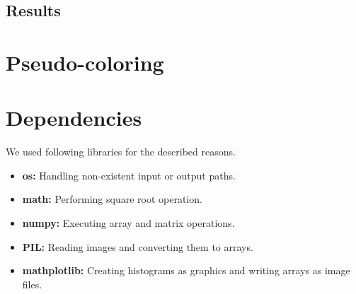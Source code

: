 \documentclass[conference]{IEEEtran}
\begin{document}
\subsection{Results}

\section{Pseudo-coloring}

\section{Dependencies}
We used following libraries for the described reasons.
\begin{itemize}
	\item \textbf{os:} Handling non-existent input or output paths.
	\item \textbf{math:} Performing square root operation.
	\item \textbf{numpy:} Executing array and matrix operations.
	\item \textbf{PIL:} Reading images and converting them to arrays.
	\item \textbf{mathplotlib:} Creating histograms as graphics and writing arrays as image files.
\end{itemize}
\end{document}
